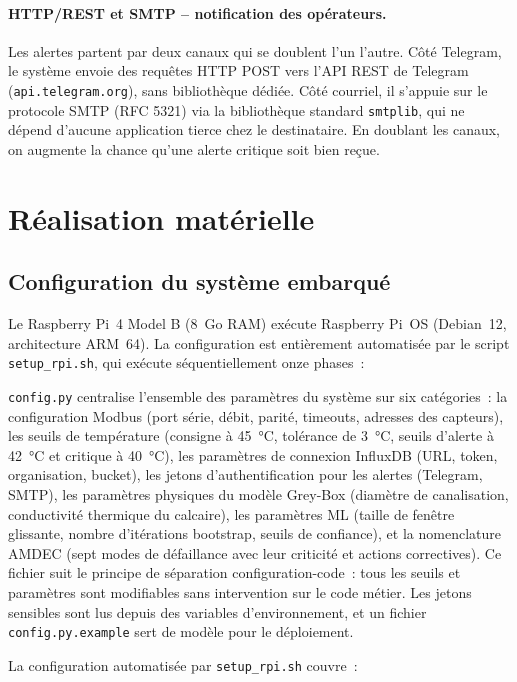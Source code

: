 \paragraph{HTTP/REST et SMTP -- notification des opérateurs.}
Les alertes partent par deux canaux qui se doublent l'un l'autre. Côté Telegram, le système envoie des requêtes HTTP POST vers l'API REST de Telegram (\texttt{api.telegram.org}), sans bibliothèque dédiée. Côté courriel, il s'appuie sur le protocole SMTP (RFC 5321) via la bibliothèque standard \texttt{smtplib}, qui ne dépend d'aucune application tierce chez le destinataire. En doublant les canaux, on augmente la chance qu'une alerte critique soit bien reçue.

\section{Réalisation matérielle}

\subsection{Configuration du système embarqué}

Le Raspberry Pi~4 Model B (8~Go RAM) exécute Raspberry Pi~OS (Debian~12, architecture ARM~64). La configuration est entièrement automatisée par le script \texttt{setup\_rpi.sh}, qui exécute séquentiellement onze phases~:

\medskip
\noindent\texttt{config.py} centralise l'ensemble des paramètres du système sur six catégories~: la configuration Modbus (port série, débit, parité, timeouts, adresses des capteurs), les seuils de température (consigne à 45~\si{\celsius}, tolérance de 3~\si{\celsius}, seuils d'alerte à 42~\si{\celsius} et critique à 40~\si{\celsius}), les paramètres de connexion InfluxDB (URL, token, organisation, bucket), les jetons d'authentification pour les alertes (Telegram, SMTP), les paramètres physiques du modèle Grey-Box (diamètre de canalisation, conductivité thermique du calcaire), les paramètres ML (taille de fenêtre glissante, nombre d'itérations bootstrap, seuils de confiance), et la nomenclature AMDEC (sept modes de défaillance avec leur criticité et actions correctives). Ce fichier suit le principe de séparation configuration-code~: tous les seuils et paramètres sont modifiables sans intervention sur le code métier. Les jetons sensibles sont lus depuis des variables d'environnement, et un fichier \texttt{config.py.example} sert de modèle pour le déploiement.

La configuration automatisée par \texttt{setup\_rpi.sh} couvre~:

